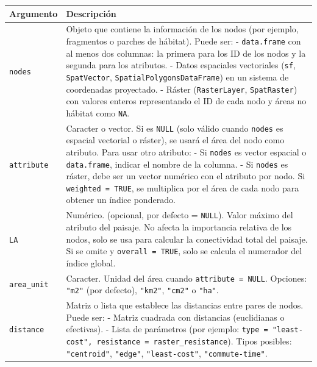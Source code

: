 \documentclass[
]{book}
\begin{document}
\begin{longtable}[]{@{}
  >{\raggedright\arraybackslash}p{}
  >{\raggedright\arraybackslash}p{}@{}}
\toprule\noalign{}
\begin{minipage}[b]{\linewidth}\raggedright
\textbf{Argumento}
\end{minipage} & \begin{minipage}[b]{\linewidth}\raggedright
\textbf{Descripción}
\end{minipage} \\
\midrule\noalign{}
\endhead
\bottomrule\noalign{}
\endlastfoot
\texttt{nodes} & Objeto que contiene la información de los nodos (por ejemplo, fragmentos o parches de hábitat). Puede ser: - \texttt{data.frame} con al menos dos columnas: la primera para los ID de los nodos y la segunda para los atributos. - Datos espaciales vectoriales (\texttt{sf}, \texttt{SpatVector}, \texttt{SpatialPolygonsDataFrame}) en un sistema de coordenadas proyectado. - Ráster (\texttt{RasterLayer}, \texttt{SpatRaster}) con valores enteros representando el ID de cada nodo y áreas no hábitat como \texttt{NA}. \\
\texttt{attribute} & Caracter o vector. Si es \texttt{NULL} (solo válido cuando \texttt{nodes} es espacial vectorial o ráster), se usará el área del nodo como atributo. Para usar otro atributo: - Si \texttt{nodes} es vector espacial o \texttt{data.frame}, indicar el nombre de la columna. - Si \texttt{nodes} es ráster, debe ser un vector numérico con el atributo por nodo. Si \texttt{weighted\ =\ TRUE}, se multiplica por el área de cada nodo para obtener un índice ponderado. \\
\texttt{LA} & Numérico. (opcional, por defecto = \texttt{NULL}). Valor máximo del atributo del paisaje. No afecta la importancia relativa de los nodos, solo se usa para calcular la conectividad total del paisaje. Si se omite y \texttt{overall\ =\ TRUE}, solo se calcula el numerador del índice global. \\
\texttt{area\_unit} & Caracter. Unidad del área cuando \texttt{attribute\ =\ NULL}. Opciones: \texttt{"m2"} (por defecto), \texttt{"km2"}, \texttt{"cm2"} o \texttt{"ha"}. \\
\texttt{distance} & Matriz o lista que establece las distancias entre pares de nodos. Puede ser: - Matriz cuadrada con distancias (euclidianas o efectivas). - Lista de parámetros (por ejemplo: \texttt{type\ =\ "least-cost",\ resistance\ =\ raster\_resistance}). Tipos posibles: \texttt{"centroid"}, \texttt{"edge"}, \texttt{"least-cost"}, \texttt{"commute-time"}. \\

\end{longtable}
\end{document}
